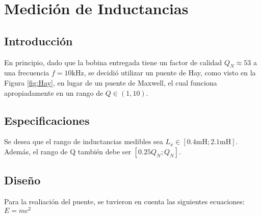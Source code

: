 \chapter{Medición de Inductancias}
    \section{Introducción}
    \begin{figure}[h]
        \begin{center}
            
        \end{center}
        
    \end{figure}
    En principio, dado que la bobina entregada tiene un factor de calidad
    $Q_N\approx53$ a una frecuencia $f=10\si{\kilo\hertz}$, se decidió utilizar un
    puente de Hay, como visto en la Figura \ref{fig:Hay}, en lugar de un puente de
    Maxwell, el cual funciona apropiadamente en un rango de $Q\in(1,10)$.
    \section{Especificaciones}
    Se desea que el rango de inductancias medibles sea $L_x\in[0.4\si{\milli\henry};
    2.1\si{\milli\henry}]$. Además, el rango de Q también debe ser $[0.25Q_N; Q_N]$.
    \section{Diseño}
    Para la realiación del puente, se tuvieron en cuenta las siguientes ecuaciones:
    \begin{math}
        E=mc^2
    \end{math}